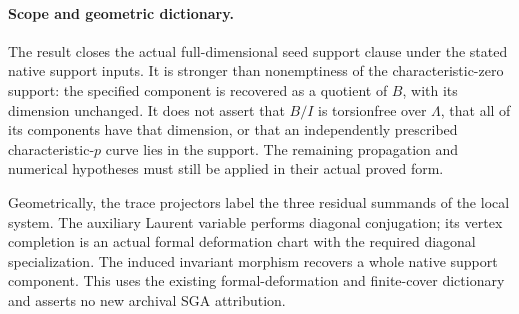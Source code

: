 \paragraph{Scope and geometric dictionary.}
The result closes the actual full-dimensional seed
support clause under the stated native support inputs.
It is stronger than nonemptiness of the characteristic-zero
support: the specified component is recovered as a
quotient of \(B\), with its dimension unchanged.
It does not assert that \(B/I\) is torsionfree over
\(\Lambda\), that all of its components have that
dimension, or that an independently prescribed
characteristic-\(p\) curve lies in the support.
The remaining propagation and numerical hypotheses
must still be applied in their actual proved form.

Geometrically, the trace projectors label the three
residual summands of the local system.
The auxiliary Laurent variable performs diagonal
conjugation; its vertex completion is an actual
formal deformation chart with the required diagonal
specialization.
The induced invariant morphism recovers a whole
native support component.  This uses the existing
formal-deformation and finite-cover dictionary and
asserts no new archival SGA attribution.
